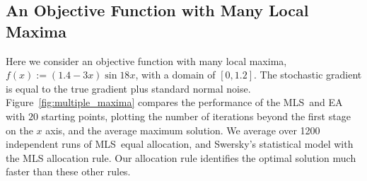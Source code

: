 \documentclass{wscpaperproc}
\theoremstyle{wsc}
\newcommand{\abbrv}{MLS}
\begin{document}
\subsection{An Objective Function with Many Local Maxima}
\label{local_maximum}
Here we consider an objective function with many local maxima, $f(x):=(1.4-3x)\sin{18x}$, with a domain of $[0,1.2]$. The stochastic gradient is equal to the true gradient plus standard normal noise.
Figure~\ref{fig:multiple_maxima} compares the performance of the \abbrv\ and EA with $20$ starting points, plotting the number of iterations beyond the first stage on the $x$ axis, and the average maximum solution. We average over 1200 independent runs of \abbrv\, equal allocation, and Swersky's statistical model with the MLS allocation rule. Our allocation rule identifies the optimal solution much faster than these other rules.
\end{document}
